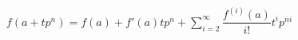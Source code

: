 \documentclass[preview]{standalone}
\begin{document}
\begin{align*}
f(a+tp^n) = f(a)+f'(a)tp^n+\sum_{i=2}^{\infty}\dfrac{f^{(i)}(a)}{i!}t^ip^{ni}
\end{align*}
\end{document}
